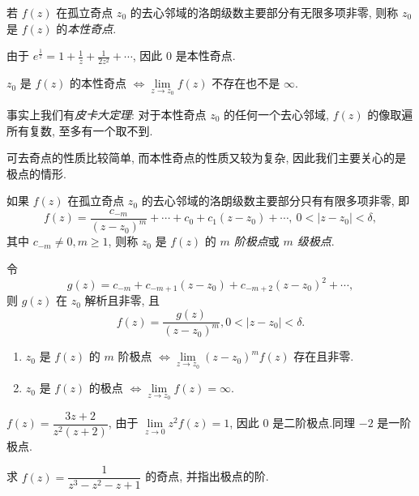 \begin{definition}
	若 $f(z)$ 在孤立奇点 $z_0$ 的去心邻域的洛朗级数主要部分有无限多项非零, 则称 $z_0$ 是 $f(z)$ 的\emph{本性奇点}.
\end{definition}

\begin{example}
	由于 $\displaystyle e^{\frac1z}=1+\frac1z+\frac1{2z^2}+\cdots$, 因此 $0$ 是本性奇点.
\end{example}

\begin{theorem}
	$z_0$ 是 $f(z)$ 的本性奇点 $\iff\lim\limits_{z\to z_0}f(z)$ 不存在也不是 $\infty$.
\end{theorem}

事实上我们有\emph{皮卡大定理}: 对于本性奇点 $z_0$ 的任何一个去心邻域, $f(z)$ 的像取遍所有复数, 至多有一个取不到.

可去奇点的性质比较简单, 而本性奇点的性质又较为复杂, 因此我们主要关心的是极点的情形.

\begin{definition}
	如果 $f(z)$ 在孤立奇点 $z_0$ 的去心邻域的洛朗级数主要部分只有有限多项非零, 即
	\[f(z)=\frac{c_{-m}}{(z-z_0)^m}+\cdots+c_0+c_1(z-z_0)+\cdots,\ 0<|z-z_0|<\delta,\]
	其中 $c_{-m}\neq 0,m\ge 1$, 则称 $z_0$ 是 $f(z)$ 的 \emph{$m$ 阶极点}或 \emph{$m$ 级极点}.
\end{definition}

令
\[g(z)=c_{-m}+c_{-m+1}(z-z_0)+c_{-m+2}(z-z_0)^2+\cdots,\]
则 $g(z)$ 在 $z_0$ 解析且非零,
且
\[f(z)=\dfrac{g(z)}{(z-z_0)^m},0<|z-z_0|<\delta.\]

\begin{theorem}
	\begin{enumerate}
		\item $z_0$ 是 $f(z)$ 的 $m$ 阶极点 $\iff\lim\limits_{z\to z_0}(z-z_0)^mf(z)$ 存在且非零.
		\item $z_0$ 是 $f(z)$ 的极点 $\iff\lim\limits_{z\to z_0}f(z)=\infty$.
	\end{enumerate}
\end{theorem}

\begin{example}
		$f(z)=\dfrac{3z+2}{z^2(z+2)}$,
	{由于 $\lim\limits_{z\to 0}z^2f(z)=1$, 因此 $0$ 是二阶极点.同理 $-2$ 是一阶极点.
	}
\end{example}

\begin{exercise}
	求 $f(z)=\dfrac1{z^3-z^2-z+1}$ 的奇点, 并指出极点的阶.
\end{exercise}

